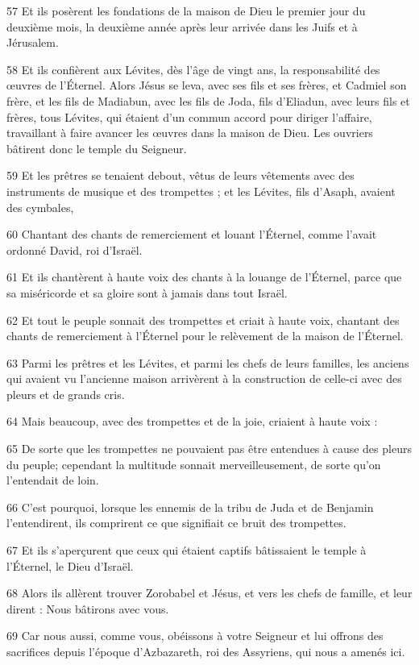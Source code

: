 \par 57 Et ils posèrent les fondations de la maison de Dieu le premier jour du deuxième mois, la deuxième année après leur arrivée dans les Juifs et à Jérusalem.
\par 58 Et ils confièrent aux Lévites, dès l'âge de vingt ans, la responsabilité des œuvres de l'Éternel. Alors Jésus se leva, avec ses fils et ses frères, et Cadmiel son frère, et les fils de Madiabun, avec les fils de Joda, fils d'Eliadun, avec leurs fils et frères, tous Lévites, qui étaient d'un commun accord pour diriger l'affaire, travaillant à faire avancer les œuvres dans la maison de Dieu. Les ouvriers bâtirent donc le temple du Seigneur.
\par 59 Et les prêtres se tenaient debout, vêtus de leurs vêtements avec des instruments de musique et des trompettes ; et les Lévites, fils d'Asaph, avaient des cymbales,
\par 60 Chantant des chants de remerciement et louant l'Éternel, comme l'avait ordonné David, roi d'Israël.
\par 61 Et ils chantèrent à haute voix des chants à la louange de l'Éternel, parce que sa miséricorde et sa gloire sont à jamais dans tout Israël.
\par 62 Et tout le peuple sonnait des trompettes et criait à haute voix, chantant des chants de remerciement à l'Éternel pour le relèvement de la maison de l'Éternel.
\par 63 Parmi les prêtres et les Lévites, et parmi les chefs de leurs familles, les anciens qui avaient vu l'ancienne maison arrivèrent à la construction de celle-ci avec des pleurs et de grands cris.
\par 64 Mais beaucoup, avec des trompettes et de la joie, criaient à haute voix :
\par 65 De sorte que les trompettes ne pouvaient pas être entendues à cause des pleurs du peuple; cependant la multitude sonnait merveilleusement, de sorte qu'on l'entendait de loin.
\par 66 C'est pourquoi, lorsque les ennemis de la tribu de Juda et de Benjamin l'entendirent, ils comprirent ce que signifiait ce bruit des trompettes.
\par 67 Et ils s'aperçurent que ceux qui étaient captifs bâtissaient le temple à l'Éternel, le Dieu d'Israël.
\par 68 Alors ils allèrent trouver Zorobabel et Jésus, et vers les chefs de famille, et leur dirent : Nous bâtirons avec vous.
\par 69 Car nous aussi, comme vous, obéissons à votre Seigneur et lui offrons des sacrifices depuis l'époque d'Azbazareth, roi des Assyriens, qui nous a amenés ici.
